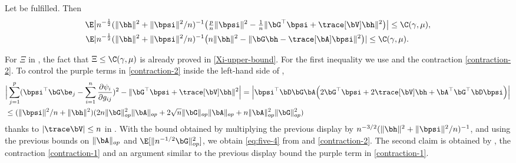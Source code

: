\documentclass{colt2022} %
\renewenvironment{proof}[1][]
{
    \begin{newproof}
    \ifthenelse{\equal{#1}{}}{ }{\textbf{(#1) }}%
}{
    \end{newproof}
}
\numberwithin{equation}{section}
\begin{document}
\begin{proposition}
    \label{prop:next-two-equations}
    Let  be fulfilled.
    Then
    \begin{align}
        \label{eq:five-4}    
        \E 
        \bigl|
        n^{-\frac12} (\|\bh\|^2 + \|\bpsi\|^2/n)^{-1}&
        \bigl(
            \tfrac p n \| \bpsi \|^{2}
            -
            \tfrac 1 n \| \bG^{\top} \bpsi + \trace[\bV] \bh \|^{2}
        \bigr)
        \bigr|
        \le \C(\gamma,\mu),
        \\
        \label{eq:five-5}
        \E 
        | 
        n^{-\frac12}
        (\|\bh\|^2 + \|\bpsi\|^2/n)^{-1}&
        \bigl(
            n \| \bh \|^{2} 
            - \| \bG \bh - \trace[\bA]\bpsi \|^{2} 
        \bigr)
        |
        \le \C(\gamma,\mu)
        .
    \end{align}
\end{proposition}
\begin{proof}
    For $\Xi$ in ,
    the fact that $\Xi\le \C(\gamma,\mu)$ is already proved in
    \eqref{Xi-upper-bound}.
    For the first inequality we use
     and
    the contraction \eqref{contraction-2}.
    To control the purple terms in \eqref{contraction-2}
    inside the left-hand side of ,
    \begin{align*}
        &
    \Big|
     \sum_{j=1}^p(\bpsi^\top\bG\be_j - \sum_{i=1}^n\frac{\partial \psi_i}{\partial g_{ij}})^2
    -
    \|\bG^\top\bpsi + \trace[\bV]\bh\|^2
    \Big|
    =
    \Big|\bpsi^\top\bD\bG\bA
    \Bigl(
    2\bG^\top \bpsi + 2\trace[\bV] \bh
    + \bA^\top\bG^\top\bD\bpsi
    \Bigr)
    \Big|
  \\&\le
  (\|\bpsi\|^2/n + \|\bh\|^2)
  (
  2n\|\bG\|_{op}^2\|\bA\|_{op}
  +
  2\sqrt n \|\bG\|_{op}\|\bA\|_{op}
  +
  n \|\bA\|_{op}^2\|\bG\|_{op}^2
  )
    \end{align*}
    thanks to $|\trace\bV| \le n$ in .
    With the bound obtained by multiplying
    the previous display by
    $n^{-3/2}(\|\bh\|^2 + \|\bpsi\|^2/n)^{-1}$,
    and using the previous bounds on $\|\bA\|_{op}$
    and $\E[\|n^{-1/2}\bG\|_{op}^2]$,
    we obtain \eqref{eq:five-4}
    from 
    and \eqref{contraction-2}.
    The second claim is obtained
    by ,
    the contraction \eqref{contraction-1}
    and an argument similar to the previous display
    bound the purple term in \eqref{contraction-1}.
\end{proof}
\end{document}

